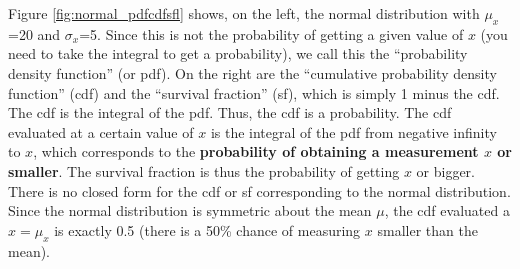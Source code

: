Figure \ref{fig:normal_pdfcdfsfl} shows, on the left, the normal distribution with $\mu_x$=20 and $\sigma_x$=5. Since this is not the probability of getting a given value of $x$ (you need to take the integral to get a probability), we call this the ``probability density function'' (or pdf). On the right are the ``cumulative probability density function'' (cdf) and the ``survival fraction'' (sf), which is simply 1 minus the cdf. The cdf is the integral of the pdf. Thus, the cdf is a probability. The cdf evaluated at a certain value of $x$ is the integral of the pdf from negative infinity to $x$, which corresponds to the \textbf{probability of obtaining a measurement $x$ or smaller}. The survival fraction is thus the probability of getting $x$ or bigger. There is no closed form for the cdf or sf corresponding to the normal distribution. Since the normal distribution is symmetric about the mean $\mu$, the cdf evaluated a $x=\mu_x$ is exactly 0.5 (there is a 50\% chance of measuring $x$ smaller than the mean).

